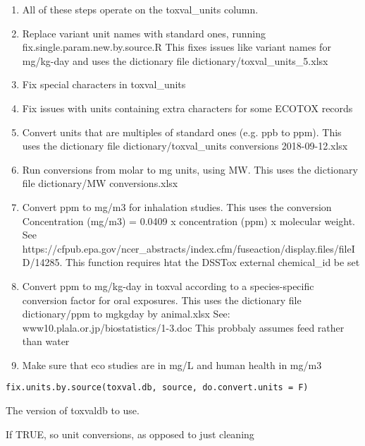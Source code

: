 \documentclass[letterpaper]{book}
\begin{document}
%
\begin{Description}\relax
\begin{enumerate}

\item{} All of these steps operate on the toxval\_units column.
\item{} Replace variant unit names with standard ones, running fix.single.param.new.by.source.R
This fixes issues like variant names for mg/kg-day and uses the dictionary
file dictionary/toxval\_units\_5.xlsx
\item{} Fix special characters in toxval\_units
\item{} Fix issues with units containing extra characters for some ECOTOX records
\item{} Convert units that are multiples of standard ones (e.g. ppb to ppm). This
uses the dictionary file dictionary/toxval\_units conversions 2018-09-12.xlsx
\item{} Run conversions from molar to mg units, using MW. This uses the dictionary file
dictionary/MW conversions.xlsx
\item{} Convert ppm to mg/m3 for inhalation studies. This uses the conversion Concentration
(mg/m3) = 0.0409 x concentration (ppm) x molecular weight. See
https://cfpub.epa.gov/ncer\_abstracts/index.cfm/fuseaction/display.files/fileID/14285.
This function requires htat the DSSTox external chemical\_id be set
\item{} Convert ppm to mg/kg-day in toxval according to a species-specific
conversion factor for oral exposures. This uses the dictionary file
dictionary/ppm to mgkgday by animal.xlsx
See: www10.plala.or.jp/biostatistics/1-3.doc
This probbaly assumes feed rather than water
\item{} Make sure that eco studies are in mg/L and human health in mg/m3

\end{enumerate}

\end{Description}
%
\begin{Usage}
\begin{verbatim}
fix.units.by.source(toxval.db, source, do.convert.units = F)
\end{verbatim}
\end{Usage}
%
\begin{Arguments}
\begin{ldescription}
\item[\code{toxval.db}] The version of toxvaldb to use.

\item[\code{do.convert.units}] If TRUE, so unit conversions, as opposed to just cleaning
\end{ldescription}
\end{Arguments}
\end{document}
